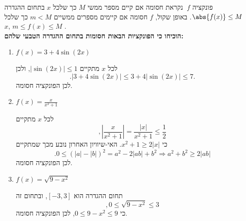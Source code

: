פונקציה
$\ f  $
נקראת חסומה אם קיים מספר ממשי
$M$
כך שלכל
$x$
בתחום ההגדרה
$\abs{f(x)}\leq M\ $.
   באופן שקול, $f$ חסומה אם  קיימים מספרים ממשיים $m<M$
   כך שלכל $x $,
   $  m\leq f(x) \leq M$ .\\
   \textbf{הוכיחו כי הפונקציות הבאות חסומות בתחום ההגדרה הטבעי שלהם:}

\begin{enumerate}
\item
$f(x)=3+4\sin(2x)$
\begin{solbox}
לכל $x$ מתקיים $|\sin(2x)|\leq1$, ולכן
\[
.|3+4\sin(2x)|\leq 3+4|\sin(2x)|\leq7.
\]
לכן הפונקציה חסומה.
\end{solbox}

\item $f(x)=\frac{x}{x^2+1}$
\begin{solbox}
לכל $x$ מתקיים
\[
,\left|\frac{x}{x^2+1}\right|=\frac{|x|}{x^2+1}\leq \frac12
\]
כי
$x^2+1\geq2|x|$.
האי-שיוויון האחרון נובע מכך שמתקיים
$$.0\le (|a|-|b|)^2=a^2-2|ab|+b^2\Longrightarrow a^2+b^2\ge 2|ab|$$
לכן הפונקציה חסומה.
\end{solbox}
\item $f(x)=\sqrt{9-x^2}$
\begin{solbox}
תחום ההגדרה הוא $[-3,3]$, ובתחום זה
\[
,0\leq \sqrt{9-x^2}\leq3
\]
כי
$0\le 9-x^2\le 9$,
לכן הפונקציה חסומה.
\end{solbox}
\eMs
\end{enumerate}
